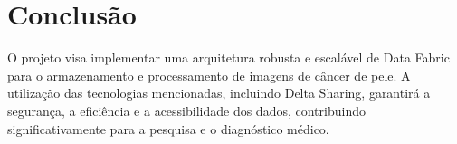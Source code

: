\section{Conclusão}

O projeto visa implementar uma arquitetura robusta e escalável de Data Fabric para o armazenamento e processamento de imagens de câncer de pele. A utilização das tecnologias mencionadas, incluindo Delta Sharing, garantirá a segurança, a eficiência e a acessibilidade dos dados, contribuindo significativamente para a pesquisa e o diagnóstico médico.